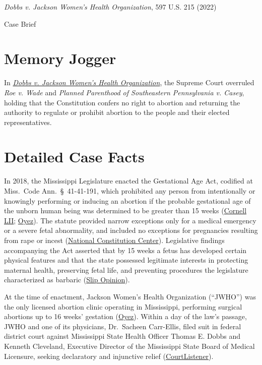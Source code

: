\documentclass[12pt]{article}
\begin{document}
\begin{center}
{\LARGE \textit{Dobbs v. Jackson Women's Health Organization}, 597 U.S. 215 (2022)\par}
\vspace{0.8em}
{\large Case Brief\par}
\end{center}
\vspace{1em}

\section{Memory Jogger}

In \href{https://www.courtlistener.com/opinion/6481357/dobbs-v-jackson-womens-health-organization/}{\textit{Dobbs v. Jackson Women's Health Organization}}, the Supreme Court overruled \textit{Roe v. Wade} and \textit{Planned Parenthood of Southeastern Pennsylvania v. Casey}, holding that the Constitution confers no right to abortion and returning the authority to regulate or prohibit abortion to the people and their elected representatives.

\section{Detailed Case Facts}

In 2018, the Mississippi Legislature enacted the Gestational Age Act, codified at Miss.\ Code Ann.\ \S~41-41-191, which prohibited any person from intentionally or knowingly performing or inducing an abortion if the probable gestational age of the unborn human being was determined to be greater than 15 weeks (\href{https://www.law.cornell.edu/supremecourt/text/19-1392}{Cornell LII}; \href{https://www.oyez.org/cases/2021/19-1392}{Oyez}). The statute provided narrow exceptions only for a medical emergency or a severe fetal abnormality, and included no exceptions for pregnancies resulting from rape or incest (\href{https://constitutioncenter.org/the-constitution/supreme-court-case-library/dobbs-v-jackson-womens-health-organization}{National Constitution Center}). Legislative findings accompanying the Act asserted that by 15 weeks a fetus has developed certain physical features and that the state possessed legitimate interests in protecting maternal health, preserving fetal life, and preventing procedures the legislature characterized as barbaric (\href{https://www.supremecourt.gov/opinions/21pdf/19-1392_6j37.pdf}{Slip Opinion}).

At the time of enactment, Jackson Women's Health Organization (``JWHO'') was the only licensed abortion clinic operating in Mississippi, performing surgical abortions up to 16 weeks' gestation (\href{https://www.oyez.org/cases/2021/19-1392}{Oyez}). Within a day of the law's passage, JWHO and one of its physicians, Dr.\ Sacheen Carr-Ellis, filed suit in federal district court against Mississippi State Health Officer Thomas E. Dobbs and Kenneth Cleveland, Executive Director of the Mississippi State Board of Medical Licensure, seeking declaratory and injunctive relief (\href{https://www.courtlistener.com/opinion/6481357/dobbs-v-jackson-womens-health-organization/}{CourtListener}).
\end{document}
